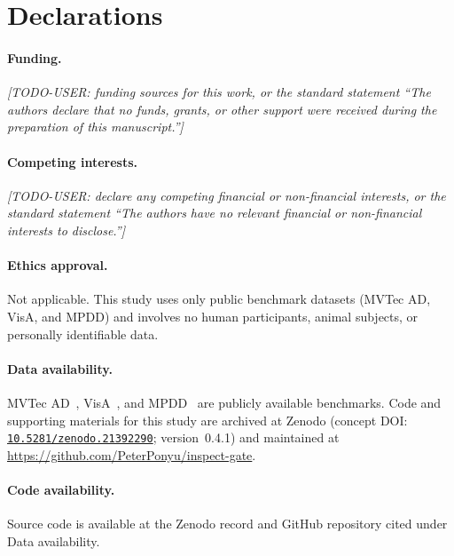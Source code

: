 \documentclass[11pt]{article}
\newcommand{\userfill}[1]{\textit{[TODO-USER: #1]}}
\begin{document}
\section*{Declarations}

\paragraph{Funding.} \userfill{funding sources for this work, or the standard
statement ``The authors declare that no funds, grants, or other support were received during the
preparation of this manuscript.''}

\paragraph{Competing interests.} \userfill{declare any competing financial or
non-financial interests, or the standard statement ``The authors have no relevant financial or
non-financial interests to disclose.''}

\paragraph{Ethics approval.} Not applicable. This study uses only public benchmark datasets
(MVTec AD, VisA, and MPDD) and involves no human participants, animal subjects, or personally
identifiable data.

\paragraph{Data availability.}
MVTec AD~\citep{bergmann2019mvtec}, VisA~\citep{zou2022spot}, and
MPDD~\citep{jezek2021mpdd} are publicly available benchmarks. Code and supporting materials
for this study are archived at Zenodo (concept DOI:
\href{https://doi.org/10.5281/zenodo.21392290}{\texttt{10.5281/zenodo.21392290}};
version~0.4.1) and maintained at \url{https://github.com/PeterPonyu/inspect-gate}.

\paragraph{Code availability.}
Source code is available at the Zenodo record and GitHub repository cited under Data availability.
\end{document}
